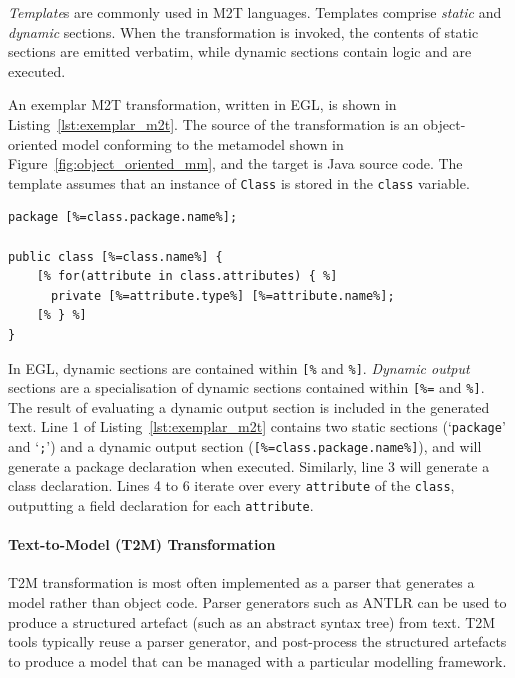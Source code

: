 \emph{Template}s are commonly used in M2T languages. Templates comprise \emph{static} and \emph{dynamic} sections. When the transformation is invoked, the contents of static sections are emitted verbatim, while dynamic sections contain logic and are executed.

An exemplar M2T transformation, written in EGL, is shown in Listing~\ref{lst:exemplar_m2t}. The source of the transformation is an object-oriented model conforming to the metamodel shown in Figure~\ref{fig:object_oriented_mm}, and the target is Java source code. The template assumes that an instance of \texttt{Class} is stored in the \texttt{class} variable.

\begin{lstlisting}[caption={[M2T transformation in EGL]M2T transformation in the Epsilon Generation Language \cite{rose08egl}}, label=lst:exemplar_m2t, language=EGL]
package [%=class.package.name%];

public class [%=class.name%] {
	[% for(attribute in class.attributes) { %]
	  private [%=attribute.type%] [%=attribute.name%];
	[% } %]
}
\end{lstlisting}

In EGL, dynamic sections are contained within \texttt{[\%} and \texttt{\%]}. \emph{Dynamic output} sections are a specialisation of dynamic sections contained within \texttt{[\%=} and \texttt{\%]}. The result of evaluating a dynamic output section is included in the generated text. Line 1 of Listing~\ref{lst:exemplar_m2t} contains two static sections (`\texttt{package}' and `\texttt{;}') and a dynamic output section (\texttt{[\%=class.package.name\%]}), and will generate a package declaration when executed.  Similarly, line 3 will generate a class declaration. Lines 4 to 6 iterate over every \texttt{attribute} of the \texttt{class}, outputting a field declaration for each \texttt{attribute}.


\paragraph{Text-to-Model (T2M) Transformation} T2M transformation is most often implemented as a parser that generates a model rather than object code. Parser generators such as ANTLR \cite{parr07antlr} can be used to produce a structured artefact (such as an abstract syntax tree) from text. T2M tools typically reuse  a parser generator, and post-process the structured artefacts to produce a model that can be managed with a particular modelling framework.

